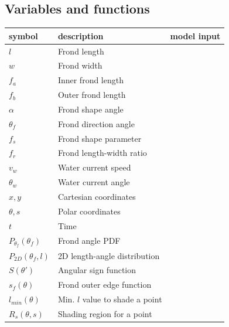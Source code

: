 \documentclass[10pt]{article}
\newenvironment{mcfig}
	{\par\medskip\noindent\minipage{\linewidth}}
	{\endminipage\par\medskip}
\begin{document}
\begin{multicols}{2}
\subsection{Variables and functions}
\begin{mcfig}
	\centering
	\begin{tabular}{@{}llc@{}} \toprule
		symbol                    & description                           & model input \\ \midrule
		$l$                       & Frond length                          & \\
		$w$                       & Frond width                           & \\
		$f_a$                     & Inner frond length                    & \\
		$f_b$                     & Outer frond length                    & \\
		$\alpha$                  & Frond shape angle                     & \\
		$\theta_f$                & Frond direction angle                 & \\
		$f_s$                     & Frond shape parameter                 & \checkmark \\
		$f_r$                     & Frond length-width ratio              & \checkmark \\
		$v_w$                     & Water current speed                   & \checkmark \\
		$\theta_w$                & Water current angle                   & \checkmark \\
		$x,y$                     & Cartesian coordinates                 & \\
		$\theta,s$                & Polar coordinates                     & \\
		$t$                       & Time                                  & \\
		$P_{\theta_f}(\theta_f)$  & Frond angle PDF                       & \\
		$P_{2D}(\theta_f,l)$      & 2D length-angle distribution          & \\
		$S(\theta')$              & Angular sign function                 & \\
		$s_f(\theta)$             & Frond outer edge function             & \\ 
		$l_{min}(\theta)$         & Min. $l$ value to shade a point       & \\
		$R_s(\theta,s)$           & Shading region for a point            & \\

\end{tabular}
\end{mcfig}
\end{multicols}
\end{document}
